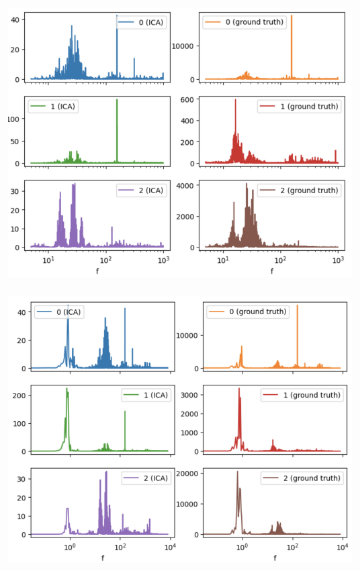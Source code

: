 \documentclass[10pt]{article}
\begin{document}
\begin{figure}[ht]
    \centering
    \hspace{-0.2in}
    \begin{subfigure}{0.4\textwidth}
        \centerline{\includegraphics[width=\textwidth]{single-sensor-ica-freq-domain-phase-unaligned-without-filter-source-power-spectra}}
        \caption{\label{fig:single-sensor-ica-freq-domain-phase-unaligned-without-filter-source-power-spectra-passband}}
    \end{subfigure}
    \begin{subfigure}{0.4\textwidth}
        \centerline{\includegraphics[width=\textwidth]{single-sensor-ica-freq-domain-phase-unaligned-without-filter-source-power-spectra-full}}
        \caption{\label{fig:single-sensor-ica-freq-domain-phase-unaligned-without-filter-source-power-spectra-full}}
    \end{subfigure}


\end{figure}
\end{document}
